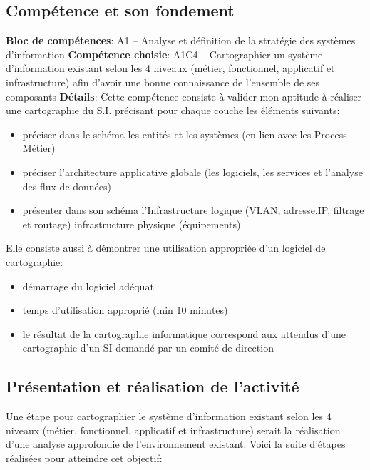 \documentclass[a4paper, 11pt]{report}
\begin{document}
\subsection{Compétence et son fondement}
\textbf{Bloc de compétences}: A1 – Analyse et définition de la stratégie des systèmes d’information
\newline
\textbf{Compétence choisie}: A1C4 – Cartographier un système d’information existant selon les 4 niveaux (métier, fonctionnel, applicatif et infrastructure) afin d’avoir une bonne connaissance de l’ensemble de ses composants
\newline
\textbf{Détails}: Cette compétence consiste à valider mon aptitude à réaliser une cartographie du S.I. précisant pour chaque couche les éléments suivants:
\begin{itemize}
  \item préciser dans le schéma les entités et les systèmes (en lien avec les Process Métier)
  \item préciser l’architecture applicative globale (les logiciels, les services et l’analyse des flux de données)
  \item présenter dans son schéma l’Infrastructure logique (VLAN, adresse.IP, filtrage et routage) infrastructure physique (équipements).
\end{itemize}
Elle consiste aussi à démontrer une utilisation appropriée d’un logiciel de cartographie:
\begin{itemize}
  \item démarrage du logiciel adéquat
  \item temps d’utilisation approprié (min 10 minutes)
  \item le résultat de la cartographie informatique correspond aux attendus d’une cartographie d’un SI demandé par un comité de direction
\end{itemize}
\subsection{Présentation et réalisation de l'activité}
Une étape pour cartographier le système d'information existant selon les 4 niveaux (métier, fonctionnel, applicatif et infrastructure) serait la réalisation d'une analyse approfondie de l'environnement existant. Voici la suite d’étapes réalisées pour atteindre cet objectif:
\end{document}

